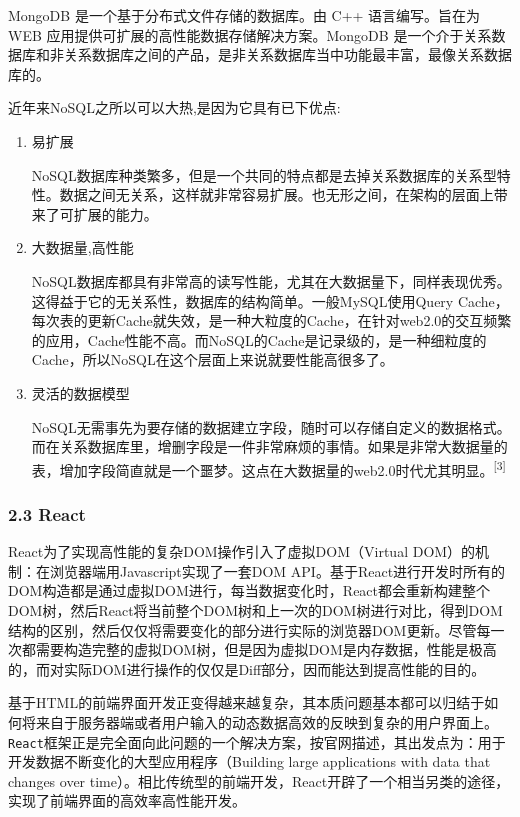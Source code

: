\documentclass[]{article}
\begin{document}
MongoDB 是一个基于分布式文件存储的数据库。由 C++ 语言编写。旨在为 WEB
应用提供可扩展的高性能数据存储解决方案。MongoDB
是一个介于关系数据库和非关系数据库之间的产品，是非关系数据库当中功能最丰富，最像关系数据库的。

近年来NoSQL之所以可以大热,是因为它具有已下优点:

\begin{enumerate}
\def\labelenumi{\arabic{enumi}.}
\item
  易扩展

  NoSQL数据库种类繁多，但是一个共同的特点都是去掉关系数据库的关系型特性。数据之间无关系，这样就非常容易扩展。也无形之间，在架构的层面上带来了可扩展的能力。
\item
  大数据量,高性能

  NoSQL数据库都具有非常高的读写性能，尤其在大数据量下，同样表现优秀。这得益于它的无关系性，数据库的结构简单。一般MySQL使用Query
  Cache，每次表的更新Cache就失效，是一种大粒度的Cache，在针对web2.0的交互频繁的应用，Cache性能不高。而NoSQL的Cache是记录级的，是一种细粒度的Cache，所以NoSQL在这个层面上来说就要性能高很多了。
\item
  灵活的数据模型

  NoSQL无需事先为要存储的数据建立字段，随时可以存储自定义的数据格式。而在关系数据库里，增删字段是一件非常麻烦的事情。如果是非常大数据量的表，增加字段简直就是一个噩梦。这点在大数据量的web2.0时代尤其明显。\textsuperscript{{[}3{]}}
\end{enumerate}

\hypertarget{header-n141}{%
\subsubsection{2.3 React}\label{header-n141}}

React为了实现高性能的复杂DOM操作引入了虚拟DOM（Virtual
DOM）的机制：在浏览器端用Javascript实现了一套DOM
API。基于React进行开发时所有的DOM构造都是通过虚拟DOM进行，每当数据变化时，React都会重新构建整个DOM树，然后React将当前整个DOM树和上一次的DOM树进行对比，得到DOM结构的区别，然后仅仅将需要变化的部分进行实际的浏览器DOM更新。尽管每一次都需要构造完整的虚拟DOM树，但是因为虚拟DOM是内存数据，性能是极高的，而对实际DOM进行操作的仅仅是Diff部分，因而能达到提高性能的目的。

基于HTML的前端界面开发正变得越来越复杂，其本质问题基本都可以归结于如何将来自于服务器端或者用户输入的动态数据高效的反映到复杂的用户界面上。\texttt{React}框架正是完全面向此问题的一个解决方案，按官网描述，其出发点为：用于开发数据不断变化的大型应用程序（Building
large applications with data that changes over
time）。相比传统型的前端开发，React开辟了一个相当另类的途径，实现了前端界面的高效率高性能开发。
\end{document}
